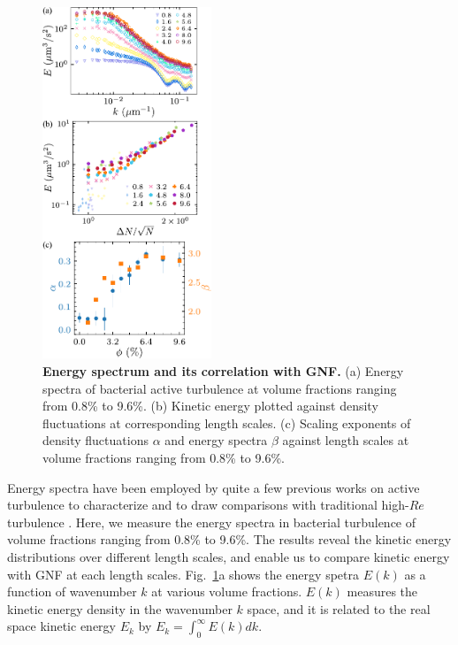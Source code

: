\documentclass[twocolumn,aps,prl,amsmath,amssymb,longbibliography]{revtex4-2}
\begin{document}
\begin{figure}[!]
\begin{center}
\includegraphics[width=0.45\textwidth]{figures/fig-8/v2.pdf}
\caption[Energy spectrum and its correlation with GNF]
{
\textbf{Energy spectrum and its correlation with GNF.}
(a) Energy spectra of bacterial active turbulence at volume fractions ranging from 0.8\% to 9.6\%.
(b) Kinetic energy plotted against density fluctuations at corresponding length scales.
(c) Scaling exponents of density fluctuations $\alpha$ and energy spectra $\beta$ against length scales at volume fractions ranging from 0.8\% to 9.6\%.
}
\label{energy-spectra}
\end{center}
\end{figure}
Energy spectra have been employed by quite a few previous works on active turbulence to characterize and to draw comparisons with traditional high-$Re$ turbulence \cite{Ishikawa2011, Dunkel2013b, Bratanov2015, Chatterjee2019, Karani2019, Skultety2020, Peng2020}. Here,
we measure the energy spectra in bacterial turbulence of volume fractions ranging from 0.8\% to 9.6\%.
The results reveal the kinetic energy distributions over different length scales, and enable us to compare kinetic energy with GNF at each length scales.
Fig.~\ref{energy-spectra}a shows the energy spetra $E(k)$ as a function of wavenumber $k$ at various volume fractions.
$E(k)$ measures the kinetic energy density in the wavenumber $k$ space, and it is related to the real space kinetic energy $E_k$ by $E_k = \int_0^\infty E(k)dk$.
\end{document}
